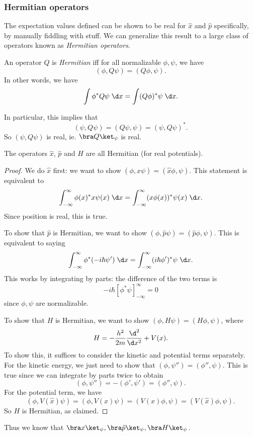 \documentclass[a4paper]{article}
\begin{document}
\subsubsection*{Hermitian operators}
The expectation values defined can be shown to be real for $\hat{x}$ and $\hat{p}$ specifically, by manually fiddling with stuff. We can generalize this result to a large class of operators known as \emph{Hermitian operators}.
\begin{defi}
  An operator $Q$ is \emph{Hermitian} iff for all normalizable $\phi, \psi$, we have
  \[
    (\phi, Q\psi) = (Q\phi, \psi).
  \]
  In other words, we have
  \[
    \int \phi^* Q\psi \;\d x= \int(Q\phi)^* \psi \;\d x.
  \]
\end{defi}
In particular, this implies that
\[
  (\psi, Q\psi) = (Q\psi, \psi) = (\psi, Q\psi)^*.
\]
So $(\psi, Q\psi)$ is real, ie. $\bra Q\ket_\psi$ is real.
\begin{prop}
  The operators $\hat{x}$, $\hat{p}$ and $H$ are all Hermitian (for real potentials).
\end{prop}

\begin{proof}
  We do $\hat{x}$ first: we want to show $(\phi, \hat{x} \psi) = (\hat{x}\phi, \psi)$. This statement is equivalent to
  \[
    \int_{-\infty}^\infty \phi(x)^* x\psi (x)\;\d x = \int_{-\infty}^\infty (x\phi(x))^* \psi(x)\;\d x.
  \]
  Since position is real, this is true.

  To show that $\hat{p}$ is Hermitian, we want to show $(\phi, \hat{p} \psi) = (\hat{p}\phi, \psi)$. This is equivalent to saying
  \[
    \int_{-\infty}^\infty \phi^*(-i\hbar \psi')\;\d x = \int_{-\infty}^\infty (i\hbar \phi')^*\psi \;\d x.
  \]
  This works by integrating by parts: the difference of the two terms is
  \[
    -i\hbar [\phi^*\psi]_{-\infty}^\infty = 0
  \]
  since $\phi, \psi$ are normalizable.

  To show that $H$ is Hermitian, we want to show $(\phi, H\psi) = (H\phi, \psi)$, where
  \[
    H = -\frac{h^2}{2m}\frac{\d^2}{\d x^2} + V(x).
  \]
  To show this, it suffices to consider the kinetic and potential terms separately. For the kinetic energy, we just need to show that $(\phi, \psi'') = (\phi'', \psi)$. This is true since we can integrate by parts twice to obtain
  \[
    (\phi, \psi'') = -(\phi', \psi') = (\phi'', \psi).
  \]
  For the potential term, we have
  \[
    (\phi, V(\hat{x})\psi) = (\phi, V(x) \psi) = (V(x)\phi, \psi) = (V(\hat{x})\phi, \psi).
  \]
  So $H$ is Hermitian, as claimed.
\end{proof}
Thus we know that $\bra x\ket_\psi, \bra \hat{p}\ket_\psi, \bra H\ket_\psi$.
\end{document}
